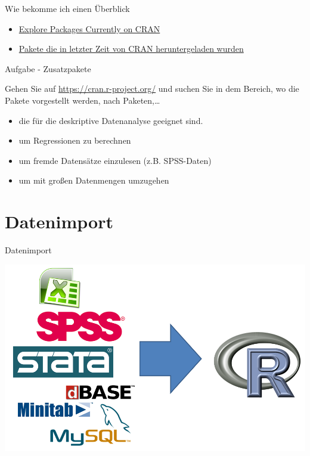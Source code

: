 \documentclass[
  ignorenonframetext,
]{beamer}
\providecommand{\tightlist}{%
  \setlength{\itemsep}{0pt}\setlength{\parskip}{0pt}}
\begin{document}
\begin{frame}{Wie bekomme ich einen Überblick}
\protect\hypertarget{wie-bekomme-ich-einen-uberblick}{}

\begin{itemize}
\item
  \href{https://mran.microsoft.com/packages/}{Explore Packages Currently
  on CRAN}
\item
  \href{https://gallery.shinyapps.io/cran-gauge/}{Pakete die in letzter
  Zeit von CRAN heruntergeladen wurden}
\end{itemize}

\end{frame}

\begin{frame}{Aufgabe - Zusatzpakete}
\protect\hypertarget{aufgabe---zusatzpakete}{}

Gehen Sie auf \url{https://cran.r-project.org/} und suchen Sie in dem
Bereich, wo die Pakete vorgestellt werden, nach Paketen,\ldots{}

\begin{itemize}
\tightlist
\item
  die für die deskriptive Datenanalyse geeignet sind.
\item
  um Regressionen zu berechnen
\item
  um fremde Datensätze einzulesen (z.B. SPSS-Daten)
\item
  um mit großen Datenmengen umzugehen
\end{itemize}

\end{frame}

\hypertarget{datenimport}{%
\section{Datenimport}\label{datenimport}}

\begin{frame}{Datenimport}
\protect\hypertarget{datenimport-1}{}

\includegraphics{figure/Datenimport.PNG}

\end{frame}
\end{document}
